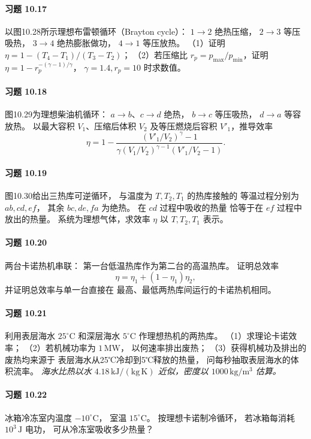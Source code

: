 \paragraph{习题 10.17}
以图10.28所示理想布雷顿循环（Brayton cycle）：
\(1\to2\) 绝热压缩，
\(2\to3\) 等压吸热，
\(3\to4\) 绝热膨胀做功，
\(4\to1\) 等压放热。
（1）证明
\(\eta=1-(T_4-T_1)/(T_3-T_2)\)；
（2）若压缩比
\(r_p=p_{\max}/p_{\min}\)，证明
\(\eta=1-r_p^{-(\gamma-1)/\gamma}\)，
\(\gamma=1.4,r_p=10\) 时求数值。

\paragraph{习题 10.18}
图10.29为理想柴油机循环：
\(a\to b\)、\(c\to d\) 绝热，
\(b\to c\) 等压吸热，
\(d\to a\) 等容放热。
以最大容积 \(V_1\)、压缩后体积 \(V_2\)
及等压燃烧后容积 \(V'_1\)，推导效率
\[
 \eta=1-
 \frac{(V'_1/V_2)^\gamma-1}
 {\gamma(V_1/V_2)^{\gamma-1}(V'_1/V_2-1)}.
\]

\paragraph{习题 10.19}
图10.30给出三热库可逆循环，
与温度为 \(T,T_2,T_1\) 的热库接触的
等温过程分别为 \(ab,cd,ef\)，
其余 \(bc,de,fa\) 为绝热。
在 \(cd\) 过程中吸收的热量
恰等于在 \(ef\) 过程中放出的热量。
系统为理想气体，求效率 \(\eta\)
以 \(T,T_2,T_1\) 表示。

\paragraph{习题 10.20}
两台卡诺热机串联：
第一台低温热库作为第二台的高温热库。
证明总效率
\[
 \eta=\eta_1+(1-\eta_1)\eta_2,
\]
并证明总效率与单一台直接在
最高、最低两热库间运行的卡诺热机相同。

\paragraph{习题 10.21}
利用表层海水 \(25^\circ\mathrm C\)
和深层海水 \(5^\circ\mathrm C\)
作理想热机的两热库。
（1）求理论卡诺效率；
（2）若机械功率为 \(1\,\mathrm{MW}\)，
以何速率排出废热；
（3）获得机械功及排出的废热均来源于
表层海水从25℃冷却到5℃释放的热量，
问每秒抽取表层海水的体积流率。
\textit{海水比热以水 \(4.18\,\mathrm{kJ/(kg\,K)}\)
近似，密度以 \(1000\,\mathrm{kg/m^3}\) 估算。}

\paragraph{习题 10.22}
冰箱冷冻室内温度 \(-10^\circ\mathrm C\)，
室温 \(15^\circ\mathrm C\)。
按理想卡诺制冷循环，
若冰箱每消耗 \(10^3\,\mathrm J\) 电功，
可从冷冻室吸收多少热量？

